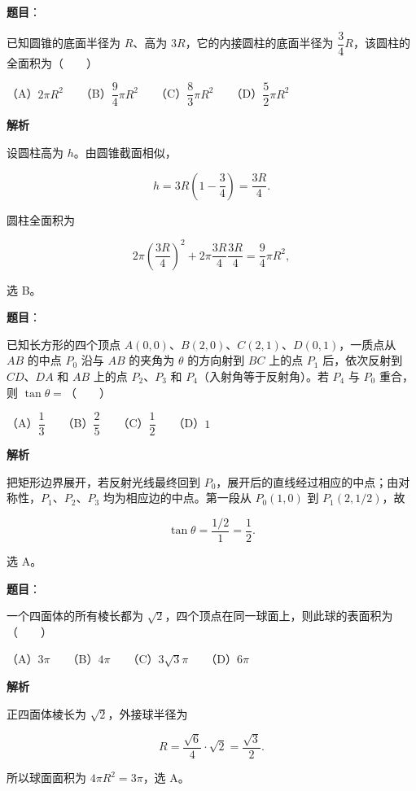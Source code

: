 \begin{answer}

\textbf{题目}：

已知圆锥的底面半径为 $R$、高为 $3R$，它的内接圆柱的底面半径为 $\dfrac34R$，该圆柱的全面积为\mbox{（　　）}

（A）$2\pi R^2$　　（B）$\dfrac94\pi R^2$　　（C）$\dfrac83\pi R^2$　　（D）$\dfrac52\pi R^2$

\textbf{解析}

设圆柱高为 $h$。由圆锥截面相似，

\nopagebreak[4]
\[
h=3R\left(1-\frac{3}{4}\right)=\frac{3R}{4}.
\]

圆柱全面积为

\nopagebreak[4]
\[
2\pi\left(\frac{3R}{4}\right)^2
+2\pi\frac{3R}{4}\frac{3R}{4}
=\frac94\pi R^2,
\]

选 B。


\end{answer}
\begin{answer}

\textbf{题目}：

已知长方形的四个顶点 $A(0,0)\text{、}B(2,0)\text{、}C(2,1)\text{、}D(0,1)$，一质点从 $AB$ 的中点 $P_0$ 沿与 $AB$ 的夹角为 $\theta$ 的方向射到 $BC$ 上的点 $P_1$ 后，依次反射到 $CD\text{、}DA$ 和 $AB$ 上的点 $P_2\text{、}P_3$ 和 $P_4$（入射角等于反射角）。若 $P_4$ 与 $P_0$ 重合，则 $\tan\theta=$\mbox{（　　）}

（A）$\dfrac13$　　（B）$\dfrac25$　　（C）$\dfrac12$　　（D）$1$

\textbf{解析}

把矩形边界展开，若反射光线最终回到 $P_0$，展开后的直线经过相应的中点；由对称性，$P_1\text{、}P_2\text{、}P_3$ 均为相应边的中点。第一段从 $P_0(1,0)$ 到 $P_1(2,1/2)$，故

\nopagebreak[4]
\[
\tan\theta=\frac{1/2}{1}=\frac12.
\]

选 A。


\end{answer}
\begin{answer}

\textbf{题目}：

一个四面体的所有棱长都为 $\sqrt2$，四个顶点在同一球面上，则此球的表面积为\mbox{（　　）}

（A）$3\pi$　　（B）$4\pi$　　（C）$3\sqrt3\pi$　　（D）$6\pi$

\textbf{解析}

正四面体棱长为 $\sqrt2$，外接球半径为

\nopagebreak[4]
\[
R=\frac{\sqrt6}{4}\cdot\sqrt2=\frac{\sqrt3}{2}.
\]

所以球面面积为 $4\pi R^2=3\pi$，选 A。


\end{answer}

